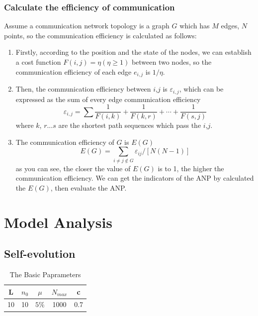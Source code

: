 \documentclass{article}
\begin{document}
\subsubsection{Calculate the efficiency of communication}
Assume a communication network topology is a graph $G$ which has $M$ edges, $N$ points, so the communication
efficiency is calculated as follows:
\begin{enumerate}
    \item Firstly, according to the position and the state of the nodes, we can establish a cost function
    \(F(i,j)=\eta (\eta \ge1)\)
    between two nodes, so the communication efficiency of each edge \(e_{i,j}\) is \(1/\eta\).
    \item Then, the communication efficiency between $i$,$j$ is \(\varepsilon_{i,j}\), which can be expressed
    as the sum of every edge communication efficiency
    \begin{displaymath}
    \varepsilon_{i,j}=\sum\frac{1}{F(i,k)}+\frac{1}{F(k,r)}+\cdots+\frac{1}{F(s,j)}
    \end{displaymath}
    where $k$, $r$...$s$ are the shortest path sequences which pass the $i$,$j$.
    \item The communication efficiency of $G$ is $E(G)$
    \begin{displaymath}
    E(G)=\sum_{i\ne j\notin G}\varepsilon_{ij}/[N(N-1)]
    \end{displaymath}
    as you can see, the closer the value of $E(G)$ is to 1, the higher the communication efficiency.
    We can get the indicators of the ANP by calculated the $E(G)$, then evaluate the ANP.
\end{enumerate}

\section{Model Analysis}
\subsection{Self-evolution}
\renewcommand\arraystretch{1.2}
\begin{table}%
  \centering
  \caption{The Basic Paprameters}\label{tab:tab1}
  \begin{tabular}{ccccc}
  \hline
  L & $n_0$ & $\mu$ & $N_{max}$ & c \\
  \hline
  10 & 10 & $5\%$ & 1000 & 0.7 \\
  \hline
\end{tabular}

\end{table}
\end{document}
